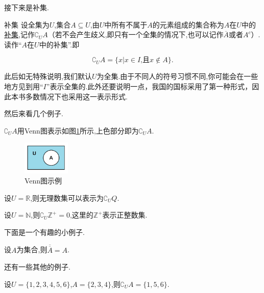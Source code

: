 \documentclass[lang=cn,math=cm,chinesefont=nofont,11pt,scheme=chinese,twocol]{elegantbook}
\begin{document}
接下来是补集.

\begin{definition}{补集}
  设全集为$U$,集合$A\subseteq U$,由$U$中所有不属于$A$的元素组成的集合称为$A$在$U$中的\underline{补集},记作${\complement}_{U}A$（若不会产生歧义,即只有一个全集的情况下,也可以记作$\overline{A}$或者$A^c$）.读作“$A$在$U$中的补集”.即

  $${\complement}_{U}A=\{x|x\in I\text{,且}x\notin A\}.$$
\end{definition}

\begin{remark}
  此后如无特殊说明,我们默认$U$为全集.由于不同人的符号习惯不同,你可能会在一些地方见到用“$I$”表示全集的.此外还要说明一点，我国的国标采用了第一种形式，因此本书多数情况下也采用这一表示形式.
\end{remark}

  然后来看几个例子.

\begin{example}
  $\complement_{U}A$用Venn图表示如图\ref{img:Venn3}所示,上色部分即为$\complement_{U}A$.
\end{example}

\begin{figure}[h]
  \centering
  \includegraphics[width=0.2\textwidth]{image/Venn3.png}
  \caption{Venn图示例}
  \label{img:Venn3}
\end{figure}

\begin{example}
  设$U=\mathbb{R}$,则无理数集可以表示为$\complement_{U}Q$.
\end{example}

\begin{example}
  设$U=\mathbb{N}$,则$\complement_{U}\mathbb{Z}^+={0}$,这里的$\mathbb{Z}^+$表示正整数集.
\end{example}

下面是一个有趣的小例子.

\begin{example}
  设$A$为集合,则$\overline{\overline{A}}=A$.
\end{example}

还有一些其他的例子.

\begin{example}
  设$U=\{1,2,3,4,5,6\}$,$A=\{2,3,4\}$,则$\complement_{U}A=\{1,5,6\}.$
\end{example}
\end{document}
